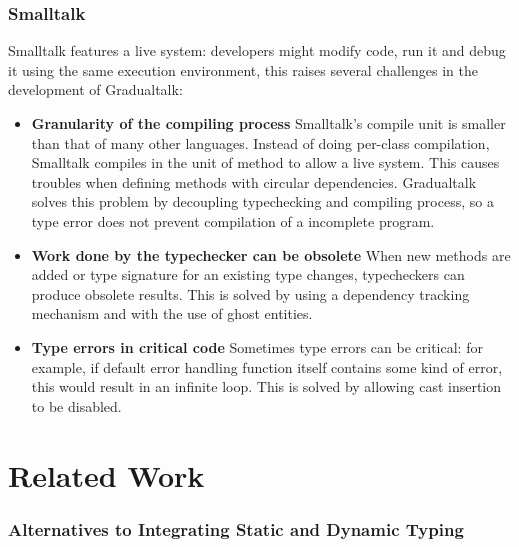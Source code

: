 \subsubsection{Smalltalk}

Smalltalk features a live system: developers might modify code, run it and debug it using the same execution environment, this raises several challenges in the development of Gradualtalk:

\begin{itemize}
	\item \textbf{Granularity of the compiling process}
	Smalltalk's compile unit is smaller than that of many other languages.
	Instead of doing per-class compilation, Smalltalk compiles in the unit of method to
	allow a live system. This causes troubles when defining methods with circular dependencies.
	Gradualtalk solves this problem by decoupling typechecking and compiling process,
	so a type error does not prevent compilation of a incomplete program.
	\item \textbf{Work done by the typechecker can be obsolete}
	When new methods are added or type signature for an existing type changes,
	typecheckers can produce obsolete results. This is solved by using a dependency tracking
	mechanism and with the use of ghost entities.
	\item \textbf{Type errors in critical code} Sometimes type errors can be critical:
	for example, if default error handling function itself contains some kind of error,
	this would result in an infinite loop. This is solved by allowing cast insertion
	to be disabled.
\end{itemize}

\section{Related Work}


\subsubsection{Alternatives to Integrating Static and Dynamic Typing}

